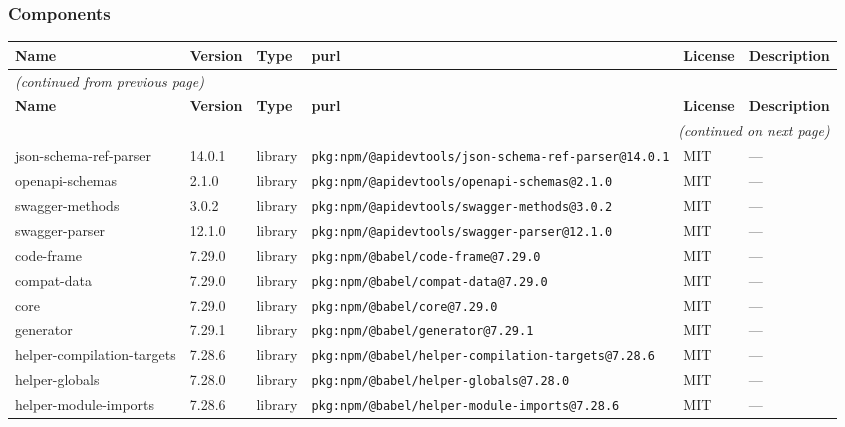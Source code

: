 \documentclass[11pt,a4paper]{article}
\begin{document}
\subsubsection*{Components}
\begin{longtable}{|p{4cm}|p{2cm}|p{1.6cm}|p{5cm}|p{1.5cm}|p{3.5cm}|}
\toprule
\rowcolor{sbomhdr}\textbf{Name} & \textbf{Version} & \textbf{Type} & \textbf{purl} & \textbf{License} & \textbf{Description} \\
\midrule
\endfirsthead
\multicolumn{6}{l}{\small\itshape (continued from previous page)} \\
\toprule
\rowcolor{sbomhdr}\textbf{Name} & \textbf{Version} & \textbf{Type} & \textbf{purl} & \textbf{License} & \textbf{Description} \\
\midrule
\endhead
\midrule
\multicolumn{6}{r}{\small\itshape (continued on next page)} \\
\endfoot
\bottomrule
\endlastfoot
\raggedright json-schema-ref-parser & 14.0.1 & library & \small\texttt{pkg:npm/@apidevtools/json-schema-ref-parser@14.0.1} & MIT & \small — \\
\raggedright openapi-schemas & 2.1.0 & library & \small\texttt{pkg:npm/@apidevtools/openapi-schemas@2.1.0} & MIT & \small — \\
\raggedright swagger-methods & 3.0.2 & library & \small\texttt{pkg:npm/@apidevtools/swagger-methods@3.0.2} & MIT & \small — \\
\raggedright swagger-parser & 12.1.0 & library & \small\texttt{pkg:npm/@apidevtools/swagger-parser@12.1.0} & MIT & \small — \\
\raggedright code-frame & 7.29.0 & library & \small\texttt{pkg:npm/@babel/code-frame@7.29.0} & MIT & \small — \\
\raggedright compat-data & 7.29.0 & library & \small\texttt{pkg:npm/@babel/compat-data@7.29.0} & MIT & \small — \\
\raggedright core & 7.29.0 & library & \small\texttt{pkg:npm/@babel/core@7.29.0} & MIT & \small — \\
\raggedright generator & 7.29.1 & library & \small\texttt{pkg:npm/@babel/generator@7.29.1} & MIT & \small — \\
\raggedright helper-compilation-targets & 7.28.6 & library & \small\texttt{pkg:npm/@babel/helper-compilation-targets@7.28.6} & MIT & \small — \\
\raggedright helper-globals & 7.28.0 & library & \small\texttt{pkg:npm/@babel/helper-globals@7.28.0} & MIT & \small — \\
\raggedright helper-module-imports & 7.28.6 & library & \small\texttt{pkg:npm/@babel/helper-module-imports@7.28.6} & MIT & \small — \\

\end{longtable}
\end{document}

